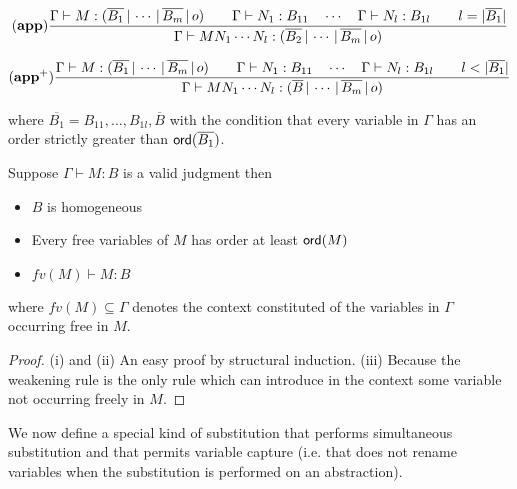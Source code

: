 $$ \mathbf{(app)} \frac{\displaystyle {{{\Gamma} \vdash {M : (\overline{B_1} \, | \, \cdots \, | \, \overline{B_m} \, | \, o)}} \qquad
{{\Gamma} \vdash {N_1 : B_{11}}} \quad \cdots \quad {{\Gamma} \vdash {N_{l} :
B_{1l}}} \qquad l = |\overline{B_1}| }}{ {{\Gamma} \vdash {M N_1
\cdots N_{l} : (\overline{B_2} \, | \, \cdots \, | \,
\overline{B_m} \, | \, o)}}} $$


$$ \mathbf{(app^+)} \frac{\displaystyle {{\Gamma} \vdash {M : (\overline{B_1} \, | \, \cdots \, | \, \overline{B_m} \, | \, o)}} \qquad
    {{\Gamma} \vdash {N_1 : B_{11}}} \quad \cdots \quad {{\Gamma} \vdash {N_{l} :
    B_{1l}}} \qquad l < |\overline{B_1}| }{ {{\Gamma} \vdash {M N_1
    \cdots N_{l} : (\overline{B} \, | \, \cdots \, | \,
    \overline{B_m} \, | \, o)}}} $$

where $\overline{B_1} = B_{11}, \ldots, B_{1l},\overline{B}$ with
the condition that every variable in $\Gamma$ has an order strictly greater
than ${\sf ord}(\overline{B_1})$.


\begin{property}
\label{proper:safe_basic_prop} Suppose $\Gamma \vdash M : B$ is a
valid judgment then
\begin{itemize}
\item[(i)] $B$ is homogeneous
\item[(ii)] Every free variables of $M$ has order at least ${\sf ord}(M)$
\item[(iii)] $fv(M) \vdash M : B$
\end{itemize}
where $fv(M) \subseteq \Gamma$ denotes the context constituted of the variables
in $\Gamma$ occurring free in $M$.
\end{property}
\begin{proof}
(i) and (ii) An easy proof by structural induction.
(iii) Because the weakening rule is the only rule which can introduce in the context some variable not occurring freely in $M$.
\end{proof}

We now define a special kind of substitution that performs simultaneous substitution and
that permits variable capture (i.e. that does not rename variables when the substitution is performed on an abstraction).


